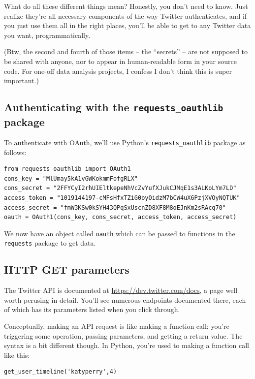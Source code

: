 \documentclass[12pt]{article}
\begin{document}
What do all these different things mean? Honestly, you don't need to know.
Just realize they're all necessary components of the way Twitter
authenticates, and if you just use them all in the right places, you'll be
able to get to any Twitter data you want, programmatically.

(Btw, the second and fourth of those items -- the ``secrets'' -- are not
supposed to be shared with anyone, nor to appear in human-readable form in
your source code. For one-off data analysis projects, I confess I don't think
this is super important.)

\subsection{Authenticating with the \texttt{requests\_oauthlib} package}

To authenticate with OAuth, we'll use Python's \texttt{requests\_oauthlib}
package as follows:

\begin{Verbatim}[fontsize=\small,samepage=true,frame=none]
from requests_oauthlib import OAuth1
cons_key = "MlUmay5kA1vGWKokmmFofgRLX"
cons_secret = "2FFYCyI2rhUIEltkepeNhVcZvYufXJukCJMqE1s3ALKoLYm7LD"
access_token = "1019144197-cMFsHfxTZiG0oyOidzM7bCW4uX6PzjXVOyNQTUK"
access_secret = "fmW3KSw0kSYH43QPqSxUscnZD8XF8M8oEJnKm2sRAcq70"
oauth = OAuth1(cons_key, cons_secret, access_token, access_secret)
\end{Verbatim}

We now have an object called \texttt{oauth} which can be passed to functions
in the \texttt{requests} package to get data.

\subsection{HTTP GET parameters}

The Twitter API is documented at \url{https://dev.twitter.com/docs}, a page
well worth perusing in detail. You'll see numerous endpoints documented there,
each of which has its parameters listed when you click through.

Conceptually, making an API request is like making a function call: you're
triggering some operation, passing parameters, and getting a return value. The
syntax is a bit different though. In Python, you're used to making a function
call like this:

\begin{Verbatim}[fontsize=\small,samepage=true,frame=none]
get_user_timeline('katyperry',4)
\end{Verbatim}
\end{document}
